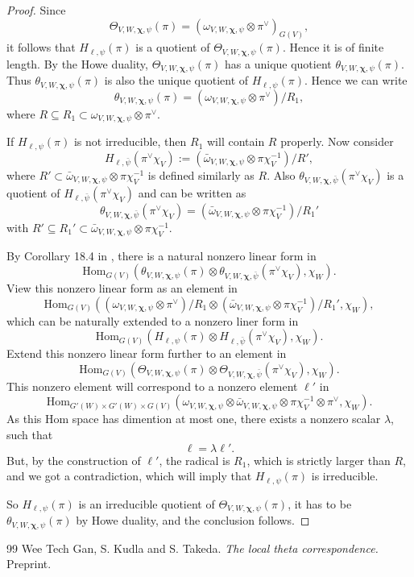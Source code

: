 \documentclass[10pt,a4paper]{amsart}
\newcommand{\Hom}{{\mathrm{Hom}}} \renewcommand{\Im}{{\mathrm{Im}}}
\begin{document}
\begin{proof}
Since 
\[
\Theta_{V,W,\boldsymbol{\chi},\psi}(\pi)=(\omega_{V,W,\boldsymbol{\chi},\psi}\otimes \pi^\vee)_{G(V)},
\]
it follows that $H_{\ell,\psi}(\pi)$ is a quotient of $\Theta_{V,W,\boldsymbol{\chi},\psi}(\pi)$. Hence it is of finite length. By the Howe duality, $\Theta_{V,W,\boldsymbol{\chi},\psi}(\pi)$ has a unique quotient $\theta_{V,W,\boldsymbol{\chi},\psi}(\pi)$. Thus $\theta_{V,W,\boldsymbol{\chi},\psi}(\pi)$ is also the unique quotient of $H_{\ell,\psi}(\pi)$. Hence we can write
\[
\theta_{V,W,\boldsymbol{\chi},\psi}(\pi) = (\omega_{V,W,\boldsymbol{\chi},\psi}\otimes \pi^\vee)/R_1,
\]
where $R\subseteq R_1\subset \omega_{V,W,\boldsymbol{\chi},\psi}\otimes \pi^\vee$.

If $H_{\ell,\psi}(\pi)$ is not irreducible, then $R_1$ will contain $R$ properly. Now consider
\[
H_{\ell, \bar{\psi}}(\pi^\vee \chi_V):=(\bar{\omega}_{V,W,\boldsymbol{\chi},\psi} \otimes \pi \chi_V^{-1} )/R',
\]
where $R'\subset \bar{\omega}_{V,W,\boldsymbol{\chi},\psi} \otimes \pi \chi_V^{-1}$ is defined similarly as $R$. Also $\theta_{V,W,\boldsymbol{\chi},\bar{\psi}}(\pi^\vee \chi_V)$ is a quotient of $H_{\ell,\bar{\psi}}(\pi^\vee \chi_V)$ and can be written as 
\[
\theta_{V,W,\boldsymbol{\chi},\bar{\psi}}(\pi^\vee \chi_V)=(\bar{\omega}_{V,W,\boldsymbol{\chi},\psi} \otimes \pi \chi_V^{-1} )/R_1'
\]
with $R'\subseteq R_1' \subset \bar{\omega}_{V,W,\boldsymbol{\chi},\psi} \otimes \pi \chi_V^{-1} $.

By Corollary 18.4 in \cite{GKT}, there is a natural nonzero linear form in 
\[
\Hom_{G(V)}(\theta_{V,W,\boldsymbol{\chi},\psi}(\pi)\otimes \theta_{V,W,\boldsymbol{\chi},\bar{\psi}}(\pi^\vee \chi_V), \chi_W).
\]
View this nonzero linear form as an element in 
\[
\Hom_{G(V)}((\omega_{V,W,\boldsymbol{\chi},\psi}\otimes \pi^\vee)/R_1 \otimes (\bar{\omega}_{V,W,\boldsymbol{\chi},\psi} \otimes \pi \chi_V^{-1} )/R_1' ,\chi_W),
\]
which can be naturally extended to a nonzero liner form in 
\[
\Hom_{G(V)}( H_{\ell,\psi}(\pi)\otimes H_{\ell,\bar{\psi}}(\pi^\vee \chi_V),\chi_W ).
\]
Extend this nonzero linear form further to an element in
\[
\Hom_{G(V)}( \Theta_{V,W,\boldsymbol{\chi},\psi}(\pi)\otimes \Theta_{V,W,\boldsymbol{\chi},\bar{\psi}}(\pi^\vee \chi_V), \chi_W  ).
\]
This nonzero element will correspond to a nonzero element $\ell'$ in
\[
\Hom_{G'(W)\times G'(W)\times G(V)} (\omega_{V,W,\boldsymbol{\chi},\psi}\otimes \bar{\omega}_{V,W,\boldsymbol{\chi},\psi} \otimes \pi \chi_V^{-1}\otimes \pi^\vee , \chi_W ).
\]
As this Hom space has dimention at most one, there exists a nonzero scalar $\lambda$, such that
\[
\ell=\lambda \ell'.
\]
But, by the construction of $\ell'$, the radical is $R_1$, which is strictly larger than $R$, and we got a contradiction, which will imply that $H_{\ell,\psi}(\pi)$ is irreducible.

So $H_{\ell,\psi}(\pi)$ is an irreducible quotient of $\Theta_{V,W,\boldsymbol{\chi},\psi}(\pi)$, it has to be $\theta_{V,W,\boldsymbol{\chi},\psi}(\pi)$ by Howe duality, and the conclusion follows.
\end{proof}

\begin{thebibliography}{99}
 Wee Tech Gan, S. Kudla and S. Takeda. {\em The local theta correspondence.} Preprint.
\end{thebibliography}
\end{document}
